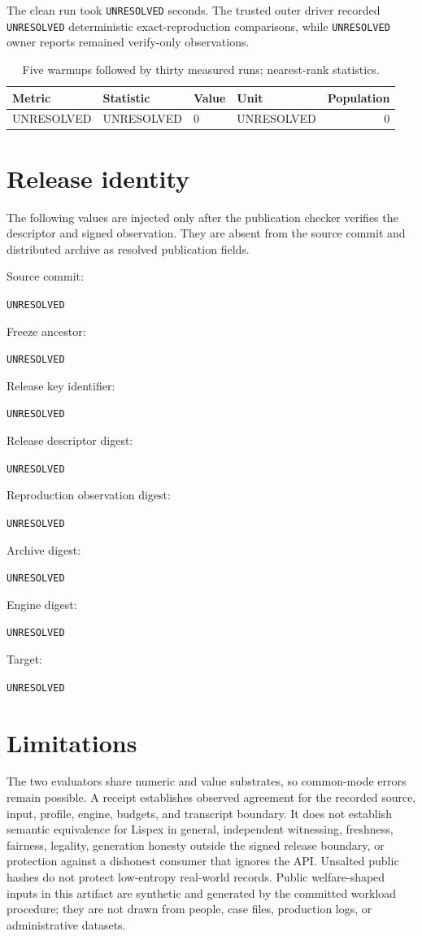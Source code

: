 \documentclass[10pt]{article}
\providecommand{\ArtifactFreezeCommit}{UNRESOLVED}
\providecommand{\ArtifactSourceCommit}{UNRESOLVED}
\providecommand{\ArtifactReleaseKeyId}{UNRESOLVED}
\providecommand{\ArtifactReleaseDescriptorDigest}{UNRESOLVED}
\providecommand{\ArtifactArchiveDigest}{UNRESOLVED}
\providecommand{\ArtifactEngineDigest}{UNRESOLVED}
\providecommand{\ArtifactTargetTriple}{UNRESOLVED}
\providecommand{\ArtifactObservationDigest}{UNRESOLVED}
\providecommand{\ArtifactComparisonCount}{UNRESOLVED}
\providecommand{\ArtifactCleanRuntime}{UNRESOLVED}
\providecommand{\ArtifactObservationalFileCount}{UNRESOLVED}
\providecommand{\ArtifactPerformanceRows}{%
  UNRESOLVED & UNRESOLVED & 0 & UNRESOLVED & 0 \\}
\newcommand{\artifactvalue}[1]{\texttt{\small #1}}
\newcommand{\artifacthash}[1]{\par\noindent\texttt{\footnotesize #1}\par}
\begin{document}
The clean run took \artifactvalue{\ArtifactCleanRuntime} seconds.  The trusted
outer driver recorded \artifactvalue{\ArtifactComparisonCount} deterministic
exact-reproduction comparisons, while
\artifactvalue{\ArtifactObservationalFileCount} owner reports remained
verify-only observations.

\begin{table}[h]
\centering
\small
\caption{Five warmups followed by thirty measured runs; nearest-rank statistics.}
\begin{tabular}{llllr}
\toprule
Metric & Statistic & Value & Unit & Population\\
\midrule
\ArtifactPerformanceRows
\bottomrule
\end{tabular}
\end{table}

\section{Release identity}

The following values are injected only after the publication checker verifies
the descriptor and signed observation.  They are absent from the source
commit and distributed archive as resolved publication fields.

\noindent Source commit:
\artifacthash{\ArtifactSourceCommit}
\noindent Freeze ancestor:
\artifacthash{\ArtifactFreezeCommit}
\noindent Release key identifier:
\artifacthash{\ArtifactReleaseKeyId}
\noindent Release descriptor digest:
\artifacthash{\ArtifactReleaseDescriptorDigest}
\noindent Reproduction observation digest:
\artifacthash{\ArtifactObservationDigest}
\noindent Archive digest:
\artifacthash{\ArtifactArchiveDigest}
\noindent Engine digest:
\artifacthash{\ArtifactEngineDigest}
\noindent Target:
\artifacthash{\ArtifactTargetTriple}

\section{Limitations}

The two evaluators share numeric and value substrates, so common-mode errors
remain possible.  A receipt establishes observed agreement for the recorded
source, input, profile, engine, budgets, and transcript boundary.  It does not
establish semantic equivalence for Lispex in general, independent witnessing,
freshness, fairness, legality, generation honesty outside the signed release
boundary, or protection against a dishonest consumer that ignores the API.
Unsalted public hashes do not protect low-entropy real-world records.  Public
welfare-shaped inputs in this artifact are synthetic and generated by the
committed workload procedure; they are not drawn from people, case files,
production logs, or administrative datasets.
\end{document}
